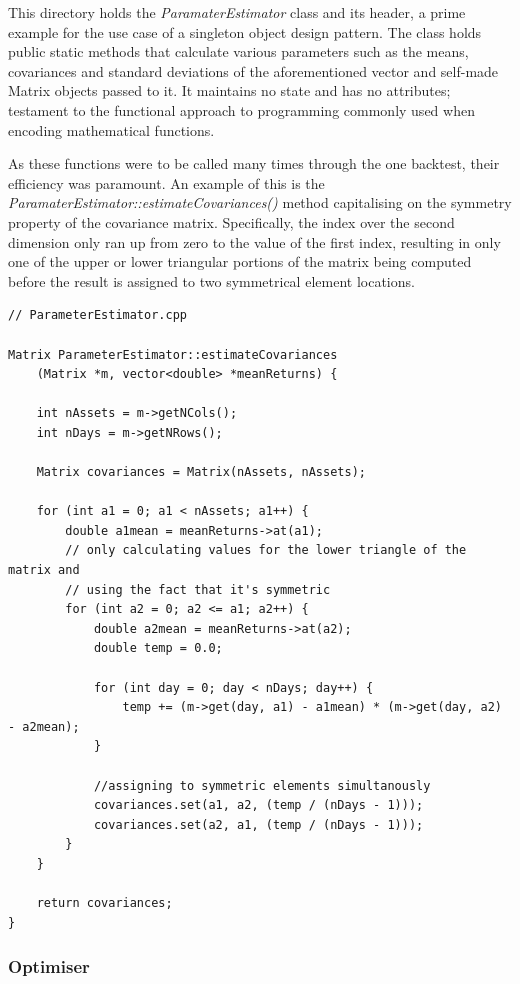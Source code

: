\documentclass{article}
\begin{document}
This directory holds the \textit{ParamaterEstimator} class and its header, a prime example for the use case of a singleton object design pattern. The class holds public static methods that calculate various parameters such as the means, covariances and standard deviations of the aforementioned vector and self-made Matrix objects passed to it. It maintains no state and has no attributes; testament to the functional approach to programming commonly used when encoding mathematical functions.

As these functions were to be called many times through the one backtest, their efficiency was paramount. An example of this is the \textit{ParamaterEstimator::estimateCovariances()} method capitalising on the symmetry property of the covariance matrix. Specifically, the index over the second dimension only ran up from zero to the value of the first index, resulting in only one of the upper or lower triangular portions of the matrix being computed before the result is assigned to two symmetrical element locations.

\begin{lstlisting}
// ParameterEstimator.cpp

Matrix ParameterEstimator::estimateCovariances 
	(Matrix *m, vector<double> *meanReturns) {

	int nAssets = m->getNCols();
	int nDays = m->getNRows();
	
	Matrix covariances = Matrix(nAssets, nAssets);
	
	for (int a1 = 0; a1 < nAssets; a1++) {
		double a1mean = meanReturns->at(a1);
		// only calculating values for the lower triangle of the matrix and
		// using the fact that it's symmetric
		for (int a2 = 0; a2 <= a1; a2++) {
			double a2mean = meanReturns->at(a2);
			double temp = 0.0;
	
			for (int day = 0; day < nDays; day++) {
				temp += (m->get(day, a1) - a1mean) * (m->get(day, a2) - a2mean);
			}
			
			//assigning to symmetric elements simultanously
			covariances.set(a1, a2, (temp / (nDays - 1)));
			covariances.set(a2, a1, (temp / (nDays - 1))); 
		}
	}
	
	return covariances;
}
\end{lstlisting}


\subsubsection{Optimiser}
\label{sec:portfolio_optimiser}
\end{document}
